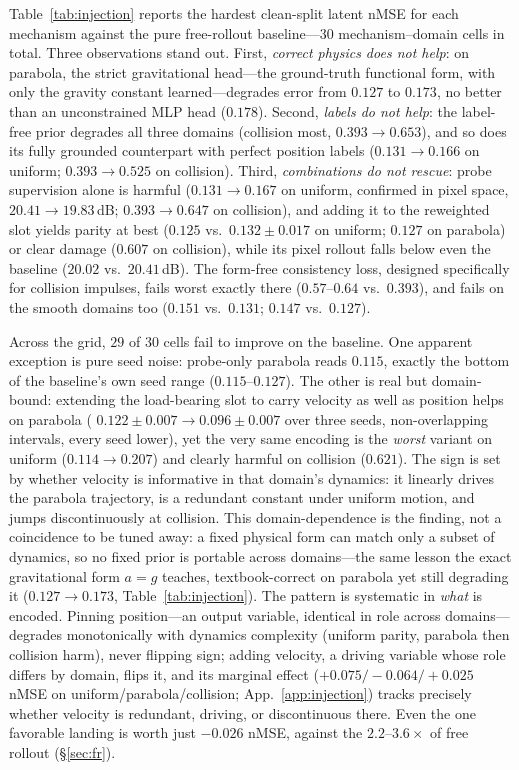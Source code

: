 Table~\ref{tab:injection} reports the hardest clean-split latent nMSE for each mechanism against the pure free-rollout baseline---$30$ mechanism--domain cells in total. Three observations stand out. First, \emph{correct physics does not help}: on parabola, the strict gravitational head---the ground-truth functional form, with only the gravity constant learned---degrades error from $0.127$ to $0.173$, no better than an unconstrained MLP head ($0.178$). Second, \emph{labels do not help}: the label-free prior degrades all three domains (collision most, $0.393\!\to\!0.653$), and so does its fully grounded counterpart with perfect position labels ($0.131\!\to\!0.166$ on uniform; $0.393\!\to\!0.525$ on collision). Third, \emph{combinations do not rescue}: probe supervision alone is harmful ($0.131\!\to\!0.167$ on uniform, confirmed in pixel space, $20.41\!\to\!19.83$\,dB; $0.393\!\to\!0.647$ on collision), and adding it to the reweighted slot yields parity at best ($0.125$ vs.\ $0.132\pm0.017$ on uniform; $0.127$ on parabola) or clear damage ($0.607$ on collision), while its pixel rollout falls below even the baseline ($20.02$ vs.\ $20.41$\,dB). The form-free consistency loss, designed specifically for collision impulses, fails worst exactly there ($0.57$--$0.64$ vs.\ $0.393$), and fails on the smooth domains too ($0.151$ vs.\ $0.131$; $0.147$ vs.\ $0.127$).

Across the grid, $29$ of $30$ cells fail to improve on the baseline. One apparent exception is pure seed noise: probe-only parabola reads $0.115$, exactly the bottom of the baseline's own seed range ($0.115$--$0.127$). The other is real but domain-bound: extending the load-bearing slot to carry velocity as well as position helps on parabola (\rmood{} $0.122{\pm}0.007\!\to\!0.096{\pm}0.007$ over three seeds, non-overlapping intervals, every seed lower), yet the very same encoding is the \emph{worst} variant on uniform ($0.114\!\to\!0.207$) and clearly harmful on collision ($0.621$). The sign is set by whether velocity is informative in that domain's dynamics: it linearly drives the parabola trajectory, is a redundant constant under uniform motion, and jumps discontinuously at collision. This domain-dependence is the finding, not a coincidence to be tuned away: a fixed physical form can match only a subset of dynamics, so no fixed prior is portable across domains---the same lesson the exact gravitational form $a{=}g$ teaches, textbook-correct on parabola yet still degrading it ($0.127\!\to\!0.173$, Table~\ref{tab:injection}). The pattern is systematic in \emph{what} is encoded. Pinning position---an output variable, identical in role across domains---degrades monotonically with dynamics complexity (uniform parity, parabola then collision harm), never flipping sign; adding velocity, a driving variable whose role differs by domain, flips it, and its marginal effect ($+0.075/{-}0.064/{+}0.025$ nMSE on uniform/parabola/collision; App.~\ref{app:injection}) tracks precisely whether velocity is redundant, driving, or discontinuous there. Even the one favorable landing is worth just $-0.026$ nMSE, against the $2.2$--$3.6\times$ of free rollout (\S\ref{sec:fr}).

